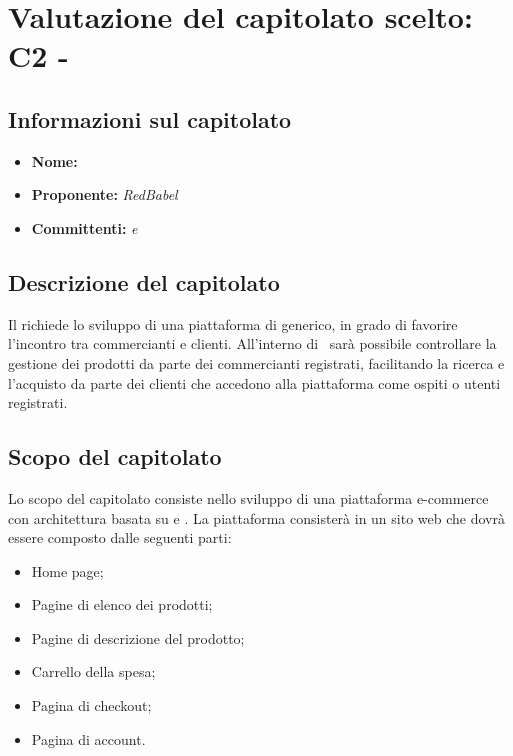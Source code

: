 \section{Valutazione del capitolato scelto: C2 - \NomeProgetto}\label{C2}
\subsection{Informazioni sul capitolato}
\begin{itemize}
	\item \textbf{Nome:} \textit{\NomeProgetto}
	\item \textbf{Proponente:} \textit{RedBabel}
	\item \textbf{Committenti:} \textit{\VT{} e \CR{}}
\end{itemize}

\subsection{Descrizione del capitolato}
Il  richiede lo sviluppo di una piattaforma di  generico, in grado di favorire l'incontro tra commercianti e clienti. All'interno di \NomeProgetto\ sarà possibile controllare la gestione dei prodotti da parte dei commercianti registrati, facilitando la ricerca e l'acquisto da parte dei clienti che accedono alla piattaforma come ospiti o utenti registrati.

\subsection{Scopo del capitolato}
Lo scopo del capitolato consiste nello sviluppo di una piattaforma e-commerce con architettura basata su  e .
La piattaforma consisterà in un sito web che dovrà essere composto dalle seguenti parti:
\begin{itemize}
	\item Home page;
	\item Pagine di elenco dei prodotti;
	\item Pagine di descrizione del prodotto;
	\item Carrello della spesa;
	\item Pagina di checkout;
	\item Pagina di account.
\end{itemize}


